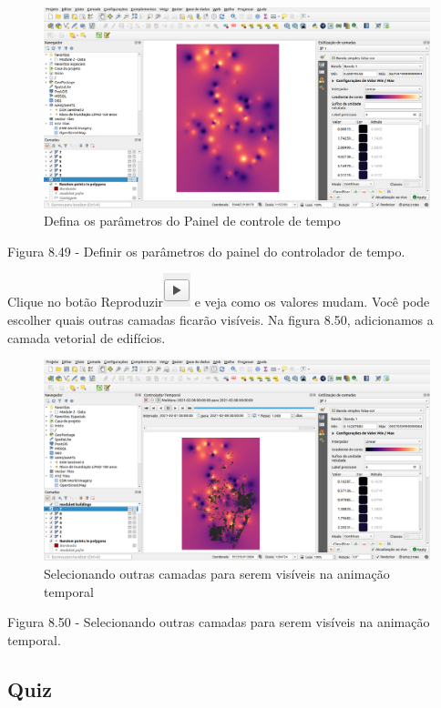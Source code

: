 \documentclass[
]{krantz}
\begin{document}
\begin{figure}
\centering
\includegraphics{media/modulo8/fig849.png}
\caption{Defina os parâmetros do Painel de controle de tempo}
\end{figure}

Figura 8.49 - Definir os parâmetros do painel do controlador de tempo.

Clique no botão Reproduzir\includegraphics{media/modulo8/play-btn.png} e veja como os valores mudam. Você pode escolher quais outras camadas ficarão visíveis. Na figura 8.50, adicionamos a camada vetorial de edifícios.

\begin{figure}
\centering
\includegraphics{media/modulo8/fig850.png}
\caption{Selecionando outras camadas para serem visíveis na animação temporal}
\end{figure}

Figura 8.50 - Selecionando outras camadas para serem visíveis na animação temporal.

\hypertarget{quiz-20}{%
\subsection{Quiz}\label{quiz-20}}
\end{document}
